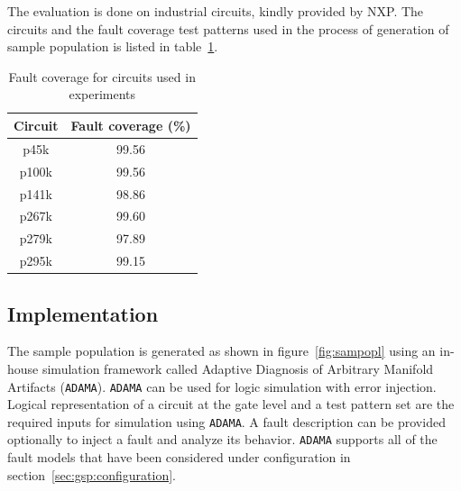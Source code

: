 The evaluation is done on industrial circuits, kindly provided by NXP. The circuits and the fault coverage test patterns used in the process of generation of sample population is listed in table~\ref{tab:fcov}.
\begin{table}[h]
\captionsetup{justification=centering}
\begin{tabular}{cc}
\hline
\textbf{Circuit} & \textbf{Fault coverage (\%)} \\ \hline
p45k             & 99.56                        \\
p100k            & 99.56                        \\
p141k            & 98.86                        \\
p267k            & 99.60                        \\
p279k            & 97.89                        \\
p295k            & 99.15                       \\
\hline
\end{tabular}
\caption{Fault coverage for circuits used in experiments}
\label{tab:fcov}
\end{table}


\subsection{Implementation}

The sample population is generated as shown in figure~\ref{fig:sampopl} using an in-house simulation framework called Adaptive Diagnosis of Arbitrary Manifold Artifacts (\texttt{ADAMA}). \texttt{ADAMA} can be used for logic simulation with error injection. Logical representation of a circuit at the gate level and a test pattern set are the required inputs for simulation using \texttt{ADAMA}. A fault description can be provided optionally to inject a fault and analyze its behavior. \texttt{ADAMA} supports all of the fault models that have been considered under configuration in section~\ref{sec:gsp:configuration}.




